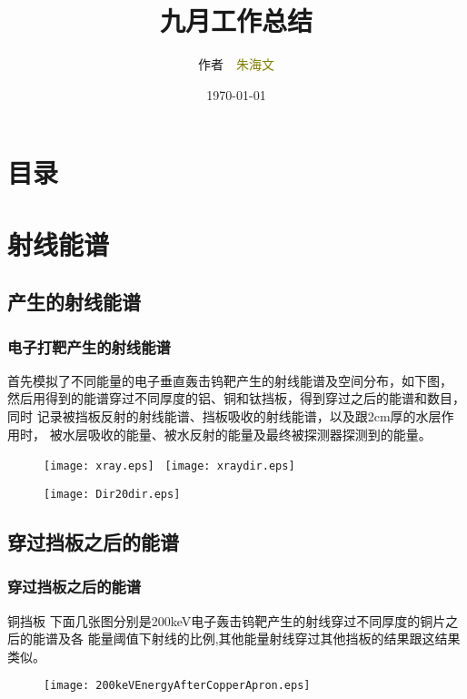 \documentclass{beamer}
\begin{document}
\begin{CJK*}{UTF8}{gkai}
  \title{九月工作总结}
  \author[\textcolor{white}{作者 朱海文}]{作者~~\textcolor{olive}{朱海文}}
  \institute{\textcolor{violet}{摩科特医疗器械有限公司}}
  \date{\today}
  \frame{\titlepage}
  \section*{目录}
  \section{射线能谱}
  \subsection{产生的射线能谱}
  \begin{frame}\frametitle{电子打靶产生的射线能谱}
    \vskip -0.3cm
    \begin{alertblock}{}\liuhao
      首先模拟了不同能量的电子垂直轰击钨靶产生的射线能谱及空间分布，如下图，
      然后用得到的能谱穿过不同厚度的铝、铜和钛挡板，得到穿过之后的能谱和数目，同时
      记录被挡板反射的射线能谱、挡板吸收的射线能谱，以及跟2cm厚的水层作用时，
      被水层吸收的能量、被水反射的能量及最终被探测器探测到的能量。
    \end{alertblock}
    \vskip -0.3cm
    \begin{figure}[ht]
      \texttt{[image: xray.eps]}~
      \texttt{[image: xraydir.eps]}

      \texttt{[image: Dir20dir.eps]}
    \end{figure}
  \end{frame}
  \subsection{穿过挡板之后的能谱}
  \begin{frame}\frametitle{穿过挡板之后的能谱}
    \vskip -0.2cm
    \begin{alertblock}{\liuhao 铜挡板}
      \liuhao 下面几张图分别是200keV电子轰击钨靶产生的射线穿过不同厚度的铜片之后的能谱及各
      能量阈值下射线的比例,其他能量射线穿过其他挡板的结果跟这结果类似。
    \end{alertblock}
    \vskip -0.2cm
    \begin{figure}[ht]
      \texttt{[image: 200keVEnergyAfterCopperApron.eps]}


\end{figure}
\end{frame}
\end{CJK*}
\end{document}
